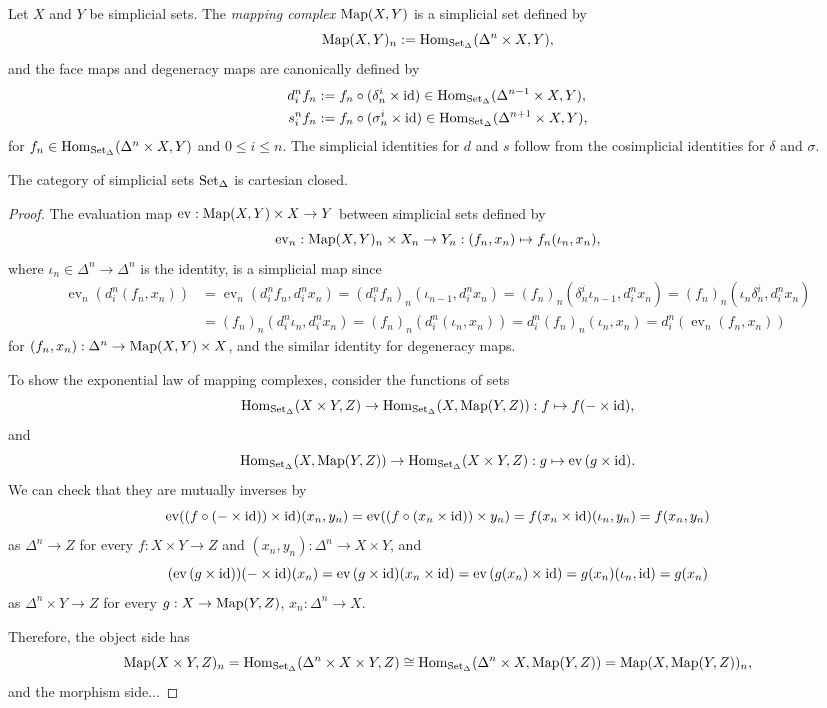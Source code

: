 \documentclass{../../../small}
\begin{document}
\begin{definition*}
Let $X$ and $Y$ be simplicial sets.
The \emph{mapping complex} $\operatorname{Map}(X,Y)$ is a simplicial set defined by
\[\operatorname{Map}(X,Y)_n:=\operatorname{Hom}_{\operatorname{Set}_\Delta}(\Delta^n\times X,Y),\]
and the face maps and degeneracy maps are canonically defined by
\begin{align*}
d_i^nf_n&:=f_n\circ(\delta_n^i\times\operatorname{id})\in\operatorname{Hom}_{\operatorname{Set}_\Delta}(\Delta^{n-1}\times X,Y),\\
s_i^nf_n&:=f_n\circ(\sigma_n^i\times\operatorname{id})\in\operatorname{Hom}_{\operatorname{Set}_\Delta}(\Delta^{n+1}\times X,Y),
\end{align*}
for $f_n\in\operatorname{Hom}_{\operatorname{Set}_\Delta}(\Delta^n\times X,Y)$ and $0\le i\le n$.
The simplicial identities for $d$ and $s$ follow from the cosimplicial identities for $\delta$ and $\sigma$.
\end{definition*}
\begin{theorem*}
The category of simplicial sets $\operatorname{Set}_\Delta$ is cartesian closed.
\end{theorem*}
\begin{proof}
The evaluation map $\operatorname{ev}:\operatorname{Map}(X,Y)\times X\to Y$ between simplicial sets defined by
\[\operatorname{ev}_n:\operatorname{Map}(X,Y)_n\times X_n\to Y_n:(f_n,x_n)\mapsto f_n(\iota_n,x_n),\]
where $\iota_n\in\Delta^n\to\Delta^n$ is the identity, is a simplicial map since
\begin{align*}
\operatorname{ev}_n(d^n_i(f_n,x_n))
&=\operatorname{ev}_n(d^n_if_n,d^n_ix_n)
=(d^n_if_n)_n(\iota_{n-1},d^n_ix_n)
=(f_n)_n(\delta^i_n\iota_{n-1},d^n_ix_n)
=(f_n)_n(\iota_n\delta_n^i,d^n_ix_n)\\
&=(f_n)_n(d^n_i\iota_n,d^n_ix_n)
=(f_n)_n(d^n_i(\iota_n,x_n))
=d^n_i(f_n)_n(\iota_n,x_n)
=d^n_i(\operatorname{ev}_n(f_n,x_n))
\end{align*}
for $(f_n,x_n):\Delta^n\to\operatorname{Map}(X,Y)\times X$, and the similar identity for degeneracy maps.

To show the exponential law of mapping complexes, consider the functions of sets
\[\operatorname{Hom}_{\operatorname{Set}_\Delta}(X\times Y,Z)\to\operatorname{Hom}_{\operatorname{Set}_\Delta}(X,\operatorname{Map}(Y,Z)):f\mapsto f(-\times\operatorname{id}),\]
and
\[\operatorname{Hom}_{\operatorname{Set}_\Delta}(X,\operatorname{Map}(Y,Z))\to\operatorname{Hom}_{\operatorname{Set}_\Delta}(X\times Y,Z):g\mapsto\operatorname{ev}\,(g\times\operatorname{id}).\]
We can check that they are mutually inverses by
\[\operatorname{ev}((f\circ(-\times\operatorname{id}))\times\operatorname{id})(x_n,y_n)
=\operatorname{ev}((f\circ(x_n\times\operatorname{id}))\times y_n)
=f(x_n\times\operatorname{id})(\iota_n,y_n)
=f(x_n,y_n)\]
as $\Delta^n\to Z$ for every $f:X\times Y\to Z$ and $(x_n,y_n):\Delta^n\to X\times Y$, and
\[(\operatorname{ev}\,(g\times\operatorname{id}))(-\times\operatorname{id})(x_n)
=\operatorname{ev}\,(g\times\operatorname{id})(x_n\times\operatorname{id})
=\operatorname{ev}\,(g(x_n)\times\operatorname{id})
=g(x_n)(\iota_n,\operatorname{id})=g(x_n)\]
as $\Delta^n\times Y\to Z$ for every $g:X\to\operatorname{Map}(Y,Z)$, $x_n:\Delta^n\to X$.

Therefore, the object side has
\[\operatorname{Map}(X\times Y,Z)_n=\operatorname{Hom}_{\operatorname{Set}_\Delta}(\Delta^n\times X\times Y,Z)\cong\operatorname{Hom}_{\operatorname{Set}_\Delta}(\Delta^n\times X,\operatorname{Map}(Y,Z))=\operatorname{Map}(X,\operatorname{Map}(Y,Z))_n,\]
and the morphism side...
\end{proof}
\end{document}
